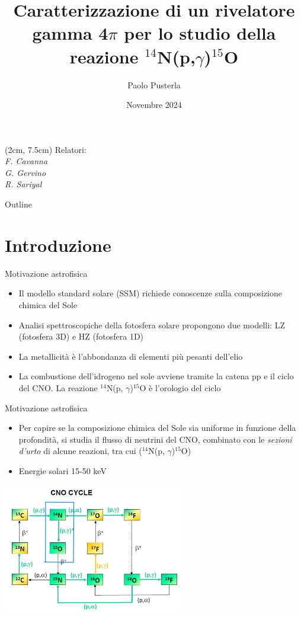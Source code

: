 \documentclass [xcolor=svgnames, 9pt] {beamer}
\title[P. Pusterla]{Caratterizzazione di un rivelatore gamma 4$\pi$ per lo studio della reazione $^{14}$N(p,$\gamma$)$^{15}$O}
\author[Fisica]{Paolo Pusterla}
\institute[UniTo]{Università degli Studi di Torino}
\date{Novembre 2024}
\begin{document}
	\begin{frame}[noframenumbering]
		\titlepage
		\begin{textblock*}{6cm}(2cm, 7.5cm) %
			\footnotesize %
			Relatori:\\
			\textit{F. Cavanna}\\
			\textit{G. Gervino}\\
			\textit{R. Sariyal}
		\end{textblock*}
	\end{frame}
	
	\begin{frame}[noframenumbering]{Outline}
		\tableofcontents
	\end{frame}
	
\section{Introduzione}
\begin{frame}{Motivazione astrofisica}
	\begin{itemize}
		\item Il modello standard solare (SSM) richiede conoscenze sulla composizione chimica del Sole
		\item Analisi spettroscopiche della fotosfera solare propongono due modelli: LZ (fotosfera 3D) e HZ (fotosfera 1D)
		\item La metallicità è l'abbondanza di elementi più pesanti dell'elio
		\item La combustione dell'idrogeno nel sole avviene tramite la catena pp e il ciclo del CNO. La reazione $^{14}$N(p, $\gamma$)$^{15}$O è l'orologio del ciclo
	\end{itemize}
	
\end{frame}
\begin{frame}{Motivazione astrofisica}
	\begin{itemize}
		\item Per capire se la composizione chimica del Sole sia uniforme in funzione della profondità, si studia il flusso di neutrini del CNO, combinato con le \emph{sezioni d'urto} di alcune reazioni, tra cui ($^{14}$N(p, $\gamma$)$^{15}$O)
		\item Energie solari 15-50 keV
	\end{itemize}
	\centering
	\includegraphics[width=0.6\textwidth]{img/CNO_Cycle.png}
\end{frame}
	
\end{document}

